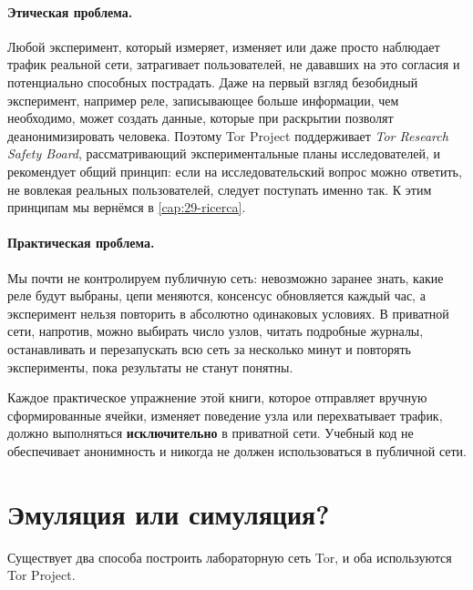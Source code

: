 \paragraph{Этическая проблема.} Любой эксперимент, который измеряет, изменяет или даже просто наблюдает трафик реальной сети, затрагивает пользователей, не дававших на это согласия и потенциально способных пострадать. Даже на первый взгляд безобидный эксперимент, например реле, записывающее больше информации, чем необходимо, может создать данные, которые при раскрытии позволят деанонимизировать человека. Поэтому Tor Project поддерживает \emph{Tor Research Safety Board}, рассматривающий экспериментальные планы исследователей, и рекомендует общий принцип: если на исследовательский вопрос можно ответить, не вовлекая реальных пользователей, следует поступать именно так. К этим принципам мы вернёмся в \cref{cap:29-ricerca}.

\paragraph{Практическая проблема.} Мы почти не контролируем публичную сеть: невозможно заранее знать, какие реле будут выбраны, цепи меняются, консенсус обновляется каждый час, а эксперимент нельзя повторить в абсолютно одинаковых условиях. В приватной сети, напротив, можно выбирать число узлов, читать подробные журналы, останавливать и перезапускать всю сеть за несколько минут и повторять эксперименты, пока результаты не станут понятны.

\begin{attenzione}
Каждое практическое упражнение этой книги, которое отправляет вручную сформированные ячейки, изменяет поведение узла или перехватывает трафик, должно выполняться \textbf{исключительно} в приватной сети. Учебный код  не обеспечивает анонимность и никогда не должен использоваться в публичной сети.
\end{attenzione}

\section{Эмуляция или симуляция?}\label{sec:rp-strumenti}

Существует два способа построить лабораторную сеть Tor, и оба используются Tor Project.

